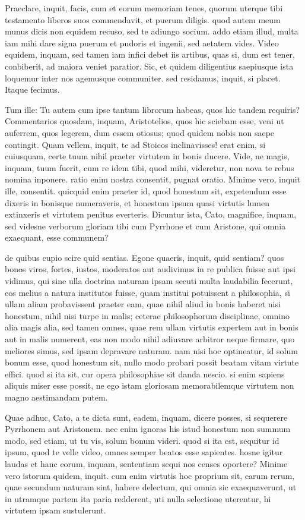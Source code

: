  Praeclare, inquit, facis, cum et eorum memoriam tenes, quorum uterque tibi testamento liberos suos commendavit, et puerum diligis. quod autem meum munus dicis non equidem recuso, sed te adiungo socium. addo etiam illud, multa iam mihi dare signa puerum et pudoris et ingenii, sed aetatem vides. Video equidem, inquam, sed tamen iam infici debet iis artibus, quas si, dum est tener, conbiberit, ad maiora veniet paratior. Sic, et quidem diligentius saepiusque ista loquemur inter nos agemusque communiter. sed residamus, inquit, si placet. Itaque fecimus.

 Tum ille: Tu autem cum ipse tantum librorum habeas, quos hic tandem requiris? Commentarios quosdam, inquam, Aristotelios, quos hic sciebam esse, veni ut auferrem, quos legerem, dum essem otiosus; quod quidem nobis non saepe contingit. Quam vellem, inquit, te ad Stoicos inclinavisses! erat enim, si cuiusquam, certe tuum nihil praeter virtutem in bonis ducere. Vide, ne magis, inquam, tuum fuerit, cum re idem tibi, quod mihi, videretur, non nova te rebus nomina inponere. ratio enim nostra consentit, pugnat oratio. Minime vero, inquit ille, consentit. quicquid enim praeter id, quod honestum sit, expetendum esse dixeris in bonisque numeraveris, et honestum ipsum quasi virtutis lumen extinxeris et virtutem penitus everteris. Dicuntur ista, Cato, magnifice, inquam, sed videsne verborum gloriam tibi cum Pyrrhone et cum Aristone, qui omnia exaequant, esse communem?

 de quibus cupio scire quid sentias. Egone quaeris, inquit, quid sentiam? quos bonos viros, fortes, iustos, moderatos aut audivimus in re publica fuisse aut ipsi vidimus, qui sine ulla doctrina naturam ipsam secuti multa laudabilia fecerunt, eos melius a natura institutos fuisse, quam institui potuissent a philosophia, si ullam aliam probavissent praeter eam, quae nihil aliud in bonis haberet nisi honestum, nihil nisi turpe in malis; ceterae philosophorum disciplinae, omnino alia magis alia, sed tamen omnes, quae rem ullam virtutis expertem aut in bonis aut in malis numerent, eas non modo nihil adiuvare arbitror neque firmare, quo meliores simus, sed ipsam depravare naturam. nam nisi hoc optineatur, id solum bonum esse, quod honestum sit, nullo modo probari possit beatam vitam virtute effici. quod si ita sit, cur opera philosophiae sit danda nescio. si enim sapiens aliquis miser esse possit, ne ego istam gloriosam memorabilemque virtutem non magno aestimandam putem.

 Quae adhuc, Cato, a te dicta sunt, eadem, inquam, dicere posses, si sequerere Pyrrhonem aut Aristonem. nec enim ignoras his istud honestum non summum modo, sed etiam, ut tu vis, solum bonum videri. quod si ita est, sequitur id ipsum, quod te velle video, omnes semper beatos esse sapientes. hosne igitur laudas et hanc eorum, inquam, sententiam sequi nos censes oportere? Minime vero istorum quidem, inquit. cum enim virtutis hoc proprium sit, earum rerum, quae secundum naturam sint, habere delectum, qui omnia sic exaequaverunt, ut in utramque partem ita paria redderent, uti nulla selectione uterentur, hi virtutem ipsam sustulerunt.

